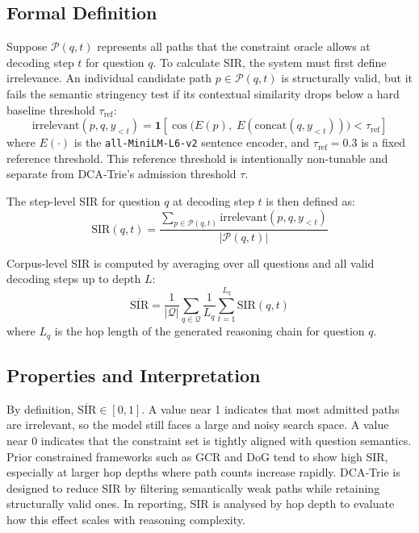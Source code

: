 \subsection{Formal Definition}

Suppose $\mathcal{P}(q, t)$ represents all paths that the constraint oracle allows at decoding step $t$ for question $q$. To calculate SIR, the system must first define irrelevance. An individual candidate path $p \in \mathcal{P}(q, t)$ is structurally valid, but it fails the semantic stringency test if its contextual similarity drops below a hard baseline threshold $\tau_{\text{ref}}$:
\begin{equation}
  \text{irrelevant}(p, q, y_{<t}) = \mathbf{1}\!\left[
    \cos\!\bigl(E(p),\; E(\text{concat}(q, y_{<t}))\bigr) < \tau_{\text{ref}}
    \right]
  \label{eq:irrelevant}
\end{equation}
where $E(\cdot)$ is the \texttt{all-MiniLM-L6-v2} sentence encoder, and $\tau_{\text{ref}} = 0.3$ is a fixed reference threshold. This reference threshold is intentionally non-tunable and separate from DCA‑Trie's admission threshold $\tau$.

The step-level SIR for question $q$ at decoding step $t$ is then defined as:
\begin{equation}
  \text{SIR}(q, t) = \frac{\sum_{p \in \mathcal{P}(q,t)}
    \text{irrelevant}(p, q, y_{<t})}{|\mathcal{P}(q, t)|}
  \label{eq:sir_step}
\end{equation}

Corpus-level SIR is computed by averaging over all questions and all valid decoding steps up to depth $L$:
\begin{equation}
  \overline{\text{SIR}} = \frac{1}{|\mathcal{Q}|} \sum_{q \in \mathcal{Q}}
  \frac{1}{L_q} \sum_{t=1}^{L_q} \text{SIR}(q, t)
  \label{eq:sir_aggregate}
\end{equation}
where $L_q$ is the hop length of the generated reasoning chain for question $q$.

\subsection{Properties and Interpretation}

By definition, $\overline{\text{SIR}} \in [0,1]$. A value near 1 indicates that most admitted paths are irrelevant, so the model still faces a large and noisy search space. A value near 0 indicates that the constraint set is tightly aligned with question semantics. Prior constrained frameworks such as GCR and DoG tend to show high SIR, especially at larger hop depths where path counts increase rapidly. DCA‑Trie is designed to reduce SIR by filtering semantically weak paths while retaining structurally valid ones. In reporting, SIR is analysed by hop depth to evaluate how this effect scales with reasoning complexity.

